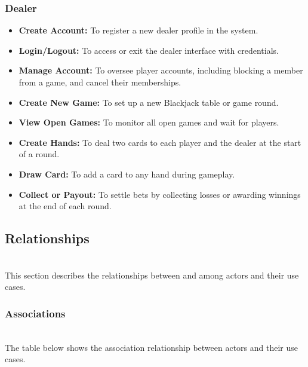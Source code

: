\subsubsection{Dealer}\label{br6YRHPg_mmFSD79mNrfK}

\begin{itemize}
\item
\protect{}\label{RVkIDkn1EwV67-u4nz5_J}
\textbf{Create Account:} To register a new dealer profile in the system.
\item
\protect{}\label{YalGHLVCe3fZeICkdvvCZ}
\textbf{Login/Logout:} To access or exit the dealer interface with credentials.
\item
\protect{}\label{uMfUQzm2I9Suv8IVaiGg4}
\textbf{Manage Account:} To oversee player accounts, including blocking a member from a game, and cancel their memberships.
\item
\protect{}\label{yQ7tVzztFVxqtR94pWtOC}
\textbf{Create New Game:} To set up a new Blackjack table or game round.
\item
\protect{}\label{amLFykGBsBwH-Zikwa7Lj}
\textbf{View Open Games:} To monitor all open games and wait for players.
\item
\protect{}\label{8AMHwaJnGU770XjHtM7rM}
\textbf{Create Hands:} To deal two cards to each player and the dealer at the start of a round.
\item
\protect{}\label{SUkiPY4JLdh9Pixwq77TA}
\textbf{Draw Card:} To add a card to any hand during gameplay.
\item
\protect{}\label{lidw9-ARxKNM1oFtSiqLV}
\textbf{Collect or Payout:} To settle bets by collecting losses or awarding winnings at the end of each round.
\end{itemize}

\subsection{Relationships}\label{4z8iTfs9KtUocdUwZSKN5}
\\
This section describes the relationships between and among actors and their use cases.

\subsubsection{Associations}\label{FJ0LyQABQpWK3XnUvhppG}
\\
The table below shows the association relationship between actors and their use cases.

